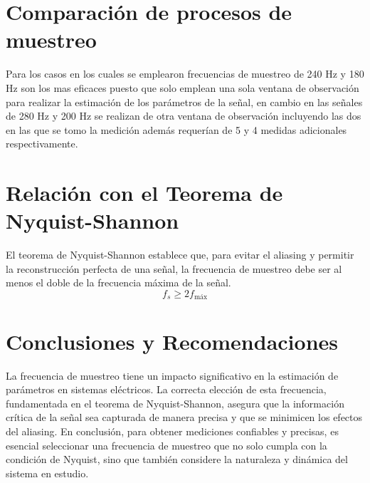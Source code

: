 \section{Comparación de procesos de muestreo}
Para los casos en los cuales se emplearon frecuencias de muestreo de 240 Hz y 180 Hz son los mas eficaces puesto que solo emplean una sola ventana de observación para realizar la estimación de los parámetros de la señal, en cambio en las señales de 280 Hz y 200 Hz se realizan de otra ventana de observación incluyendo las dos en las que se tomo la medición además requerían de 5 y 4 medidas adicionales respectivamente.\\ 

\section{Relación con el Teorema de Nyquist-Shannon}
El teorema de Nyquist-Shannon establece que, para evitar el aliasing y permitir la reconstrucción perfecta de una señal, la frecuencia de muestreo debe ser al menos el doble de la frecuencia máxima de la señal.
\begin{equation}
    f_s \geq 2 f_{\text{máx}}
\end{equation}

\section{Conclusiones y Recomendaciones}
La frecuencia de muestreo tiene un impacto significativo en la estimación de parámetros en sistemas eléctricos. La correcta elección de esta frecuencia, fundamentada en el teorema de Nyquist-Shannon, asegura que la información crítica de la señal sea capturada de manera precisa y que se minimicen los efectos del aliasing. En conclusión, para obtener mediciones confiables y precisas, es esencial seleccionar una frecuencia de muestreo que no solo cumpla con la condición de Nyquist, sino que también considere la naturaleza y dinámica del sistema en estudio.

